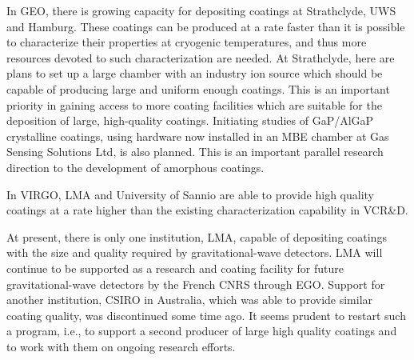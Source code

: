 In GEO, there is growing capacity for depositing coatings at Strathclyde, UWS and Hamburg. These coatings can be produced at a rate faster than it is possible to characterize their properties at cryogenic temperatures, and thus more resources devoted to such characterization are needed. 
At Strathclyde, here are plans to set up a large chamber with an industry ion source which should be capable of producing large and uniform enough coatings. This is an important priority in gaining access to more coating facilities which are suitable for the deposition of large, high-quality coatings. Initiating studies of GaP/AlGaP crystalline coatings, using hardware now installed in an MBE chamber at Gas Sensing Solutions Ltd, is also planned. This is an important parallel research direction to the development of amorphous coatings.

In VIRGO, LMA and University of Sannio are able to provide high quality coatings at a rate higher than the existing characterization capability in VCR\&D. 

At present, there is only one institution, LMA, capable of depositing coatings with the size and quality required by gravitational-wave detectors. LMA will continue to be supported as a research and coating facility for future gravitational-wave detectors by the French CNRS through EGO. Support for another institution, CSIRO in Australia, which was able to provide similar coating quality, was discontinued some time ago. It seems prudent to restart such a program, i.e., to support a second producer of large high quality coatings and to work with them on ongoing research efforts. 



